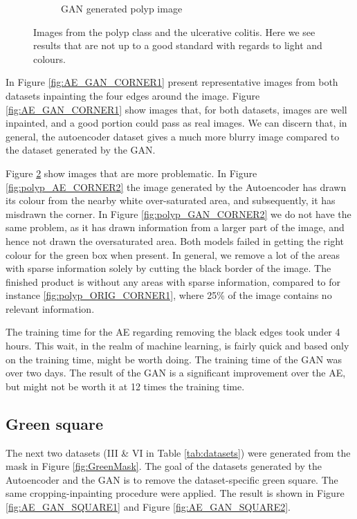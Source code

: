 \begin{figure}
\begin{subfigure}[t]{\myfigsizethree}
            \caption{GAN generated polyp image}   
            \label{fig:z_GAN_CORNER2}
        \end{subfigure}
        \caption{Images from the polyp class and the ulcerative colitis. Here we see results that are not up to a good standard with regards to light and colours.} 
        \label{fig:AE_GAN_CORNER2}
\end{figure}
    
In Figure \ref{fig:AE_GAN_CORNER1} present representative images from both datasets inpainting the four edges around the image. Figure \ref{fig:AE_GAN_CORNER1} show images that, for both datasets, images are well inpainted, and a good portion could pass as real images. We can discern that, in general, the autoencoder dataset gives a much more blurry image compared to the dataset generated by the GAN. 

Figure \ref{fig:AE_GAN_CORNER2} show images that are more problematic. In Figure \ref{fig:polyp_AE_CORNER2} the image generated by the Autoencoder has drawn its colour from the nearby white over-saturated area, and subsequently, it has misdrawn the corner. In Figure \ref{fig:polyp_GAN_CORNER2} we do not have the same problem, as it has drawn information from a larger part of the image, and hence not drawn the oversaturated area.
Both models failed in getting the right colour for the green box when present. 
In general, we remove a lot of the areas with sparse information solely by cutting the black border of the image. The finished product is without any areas with sparse information, compared to for instance \ref{fig:polyp_ORIG_CORNER1}, where 25\% of the image contains no relevant information. 

\vspace{5px}
\noindent The training time for the AE regarding removing the black edges took under 4 hours. This wait, in the realm of machine learning, is fairly quick and based only on the training time, might be worth doing.
The training time of the GAN was over two days. The result of the GAN is a significant improvement over the AE, but might not be worth it at 12 times the training time. 


\FloatBarrier
\subsection{Green square}
The next two datasets (III \& VI in Table \ref{tab:datasets}) were generated from the mask in Figure \ref{fig:GreenMask}.  The goal of the datasets generated by the Autoencoder and the GAN is to remove the dataset-specific green square. The same cropping-inpainting procedure were applied. The result is shown in Figure \ref{fig:AE_GAN_SQUARE1} and Figure \ref{fig:AE_GAN_SQUARE2}.


